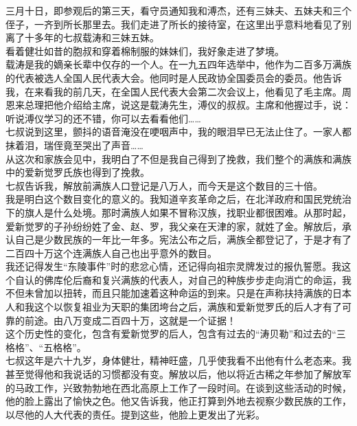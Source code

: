 三月十日，即参观后的第三天，看守员通知我和溥杰，还有三妹夫、五妹夫和三个侄子，一齐到所长那里去。我们走进了所长的接待室，在这里出乎意料地看见了别离了十多年的七叔载涛和三妹五妹。\\

看着健壮如昔的胞叔和穿着棉制服的妹妹们，我好象走进了梦境。\\

载涛是我的嫡亲长辈中仅存的一个人。在一九五四年选举中，他作为二百多万满族的代表被选人全国人民代表大会。他同时是人民政协全国委员会的委员。他告诉我，在来看我的前几天，在全国人民代表大会第二次会议上，他看见了毛主席。周恩来总理把他介绍给主席，说这是载涛先生，溥仪的叔叔。主席和他握过手，说：听说溥仪学习的还不错，你可以去看看他们……\\

七叔说到这里，颤抖的语音淹没在哽咽声中，我的眼泪早已无法止住了。一家人都抹着泪，瑞侄竟至哭出了声音……\\

从这次和家族会见中，我明白了不但是我自己得到了挽救，我们整个的满族和满族中的爱新觉罗氏族也得到了挽救。\\

七叔告诉我，解放前满族人口登记是八万人，而今天是这个数目的三十倍。\\

我是明白这个数目变化的意义的。我知道辛亥革命之后，在北洋政府和国民党统治下的旗人是什么处境。那时满族人如果不冒称汉族，找职业都很困难。从那时起，爱新觉罗的子孙纷纷姓了金、赵、罗，我父亲在天津的家，就姓了金。解放后，承认自己是少数民族的一年比一年多。宪法公布之后，满族全都登记了，于是才有了二百四十万这个连满族人自己也出乎意外的数目。\\

我还记得发生“东陵事件”时的悲忿心情，还记得向祖宗灵牌发过的报仇誓愿。我这个自认的佛库伦后裔和复兴满族的代表人，对自己的种族步步走向消亡的命运，我不但未曾加以扭转，而且只能加速着这种命运的到来。只是在声称扶持满族的日本人和我这个以恢复祖业为天职的集团垮台之后，满族和爱新觉罗氏的后人才有了可靠的前途。由八万变成二百四十万，这就是一个证据！\\

这个历史性的变化，包含有爱新觉罗的后人，包含有过去的“涛贝勒”和过去的“三格格”、“五格格”。\\

七叔这年是六十九岁，身体健壮，精神旺盛，几乎使我看不出他有什么老态来。我甚至觉得他和我说话的习惯都没有变。解放以后，他以将近古稀之年参加了解放军的马政工作，兴致勃勃地在西北高原上工作了一段时间。在谈到这些活动的时候，他的脸上露出了愉快之色。他又告诉我，他正打算到外地去视察少数民族的工作，以尽他的人大代表的责任。提到这些，他脸上更发出了光彩。\\

